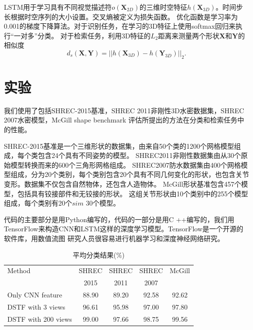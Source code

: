 LSTM用于学习具有不同视觉描述符$o(\mathbf{X}_{2D})$的三维时空特征$h(\mathbf{X}_{3D})$。时间步长根据时空序列的大小设置。交叉熵被定义为损失函数。 优化函数是学习率为0.001的梯度下降算法。对于识别任务，在学习的3D特征上使用softmax回归来执行“一对多”分类。 对于检索任务，利用3D特征的$ L_2 $距离来测量两个形状$ \mathbf {X} $和$ \mathbf {Y} $的相似度
\begin{equation}
 d_s(\mathbf{X}, \mathbf{Y}) = || h(\mathbf{X}_{3D}) - h(\mathbf{Y}_{3D}) ||_2 
 \label{cal_cal_distance}.
\end{equation}


\section{实验}
我们使用了包括SHREC-2015基准\cite {Lian2015SHREC}，SHREC 2011非刚性3D水密数据集\cite {Lian2011SHREC}，SHREC 2007水密模型\cite {giorgi2007watertight}，McGill shape benchmark \cite {zhang2005retrieving} 评估所提出的方法在分类和检索任务中的性能。

SHREC-2015基准是一个三维形状的数据集，由来自50个类的1200个网格模型组成，每个类包含24个具有不同姿势的模型。 SHREC2011非刚性数据集由从30个原始模型转换而来的600个三角形网格组成。 SHREC2007防水数据集由400个网格模型组成，分为20个类别，每个类别包含20个具有不同几何变化的形状，也包含关节变形。数据集不仅包含自然物体，还包含人造物体。 McGill形状基准包含457个模型，包括具有铰接部件和无铰接的形状。 这组关节形状由10个类别中的255个模型组成，每个类别有20个$ sim $ 30个模型。

代码的主要部分是用Python编写的，代码的一部分是用C ++编写的，我们用TensorFlow来构造CNN和LSTM这样的深度学习模型。TensorFlow是一个开源的软件库，用数值流图 研究人员很容易进行机器学习和深度神经网络研究。

\begin{table}[tbhp]
\caption{平均分类结果(\%)}\label{table_classification_results}
\begin{center}
\begin{tabular}{lcccc}  %
\hline \hline	
Method      &SHREC 		&SHREC		&SHREC          & McGill \\ 
            & 2015		& 2011			& 2007		& \\
\hline					
Only CNN feature		&88.90	    	&89.20  			&92.58				  &92.62 \\
\hline
DSTF with 3 views  							&96.61 			&95.98				&97.00          	  &97.80  \\
\hline 
DSTF with 200 views 							&99.00			&97.66				&98.75				  &99.56  \\
\hline  \hline   
\end{tabular}
\end{center} 
\end{table}


